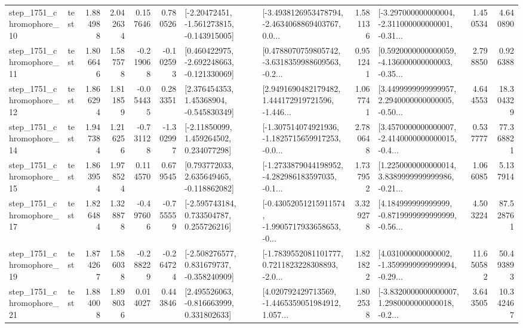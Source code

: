 \begin{tabular}{llrrrrllrlrr}
 step\_1751\_chromophore\_10 &      test &      1.884988 &    2.042634 &      0.157646 &  0.780526 &   [-2.20472451, -1.561273815, -0.143915005] &  [-3.4938126953478794, -2.4634068869403767, 0.0... &       1.581136 &  [-3.297000000000004, -2.311000000000001, -0.31... &            1.450534 &          4.640890 \\
 step\_1751\_chromophore\_11 &      test &      1.806646 &    1.587578 &     -0.219068 & -0.102593 &   [0.460422975, -2.692248663, -0.121330069] &  [0.4788070759805742, -3.6318359988609563, -0.2... &       0.951241 &  [0.5920000000000059, -4.136000000000003, -0.35... &            2.798850 &          0.926388 \\
 step\_1751\_chromophore\_12 &      test &      1.866294 &    1.811859 &     -0.054435 &  0.283351 &     [2.376454353, 1.45368904, -0.545830349] &  [2.9491690482179482, 1.444172919721596, -1.446... &       1.067741 &  [3.4499999999999957, 2.2940000000000005, -0.50... &            4.644553 &         18.304329 \\
 step\_1751\_chromophore\_14 &      test &      1.947384 &    1.216256 &     -0.731128 & -1.302997 &     [-2.11850099, 1.459264502, 0.234077298] &  [-1.307514074921936, -1.1825715659917253, -0.0... &       2.780648 &  [3.4570000000000007, -2.4140000000000015, -0.4... &            0.537777 &         77.368821 \\
 step\_1751\_chromophore\_15 &      test &      1.863954 &    1.978524 &      0.114570 &  0.679545 &    [0.793772033, 2.635649465, -0.118862082] &  [-1.2733879044198952, -4.282986183597035, -0.1... &       1.737952 &  [1.2250000000000014, 3.8389999999999986, -0.21... &            1.066085 &          5.137914 \\
 step\_1751\_chromophore\_17 &      test &      1.826484 &    1.328878 &     -0.497606 & -0.755559 &    [-2.595743184, 0.733504787, 0.255726216] &  [-0.43052051215911574, -1.9905717933658653, -0... &       3.329278 &  [4.184999999999999, -0.8719999999999999, -0.56... &            4.503224 &         87.528761 \\
 step\_1751\_chromophore\_19 &      test &      1.874267 &    1.586038 &     -0.288229 & -0.264724 &   [-2.508276577, 0.831679737, -0.358240909] &  [-1.7839552081101777, 0.7211823228308893, -2.0... &       1.821822 &  [4.031000000000002, -1.3599999999999994, -0.29... &           11.650582 &         50.493893 \\
 step\_1751\_chromophore\_21 &      test &      1.884008 &    1.898036 &      0.014027 &  0.443846 &    [2.495526063, -0.816663999, 0.331802633] &  [4.020792429713569, -1.4465359051984912, 1.057... &       1.802538 &  [-3.8320000000000007, 1.2980000000000018, -0.2... &            3.643505 &         10.342467 \\

\end{tabular}
